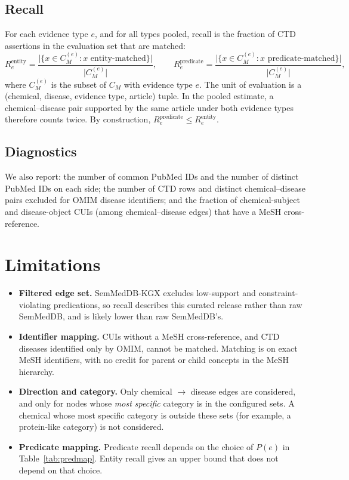 \documentclass[11pt]{article}
\begin{document}
\subsection{Recall}

For each evidence type $e$, and for all types pooled, recall is the fraction
of CTD assertions in the evaluation set that are matched:
\[
  R^{\text{entity}}_e =
    \frac{\bigl|\{x \in C_M^{(e)} : x \text{ entity-matched}\}\bigr|}
         {\bigl|C_M^{(e)}\bigr|},
  \qquad
  R^{\text{predicate}}_e =
    \frac{\bigl|\{x \in C_M^{(e)} : x \text{ predicate-matched}\}\bigr|}
         {\bigl|C_M^{(e)}\bigr|},
\]
where $C_M^{(e)}$ is the subset of $C_M$ with evidence type $e$. The unit of
evaluation is a (chemical, disease, evidence type, article) tuple. In the
pooled estimate, a chemical--disease pair supported by the same article under
both evidence types therefore counts twice. By construction,
$R^{\text{predicate}}_e \le R^{\text{entity}}_e$.

\subsection{Diagnostics}

We also report: the number of common PubMed IDs and the number of distinct
PubMed IDs on each side; the number of CTD rows and distinct
chemical--disease pairs excluded for OMIM disease identifiers; and the
fraction of chemical-subject and disease-object CUIs (among chemical--disease
edges) that have a MeSH cross-reference.

\section{Limitations}

\begin{itemize}
  \item \textbf{Filtered edge set.} SemMedDB-KGX excludes low-support and
        constraint-violating predications, so recall describes this curated
        release rather than raw SemMedDB, and is likely lower than raw
        SemMedDB's.
  \item \textbf{Identifier mapping.} CUIs without a MeSH cross-reference, and
        CTD diseases identified only by OMIM, cannot be matched. Matching is
        on exact MeSH identifiers, with no credit for parent or child
        concepts in the MeSH hierarchy.
  \item \textbf{Direction and category.} Only chemical $\rightarrow$ disease
        edges are considered, and only for nodes whose \emph{most specific}
        category is in the configured sets. A chemical whose most specific
        category is outside these sets (for example, a protein-like category)
        is not considered.
  \item \textbf{Predicate mapping.} Predicate recall depends on the choice of
        $P(e)$ in Table~\ref{tab:predmap}. Entity recall gives an upper
        bound that does not depend on that choice.
\end{itemize}
\end{document}
